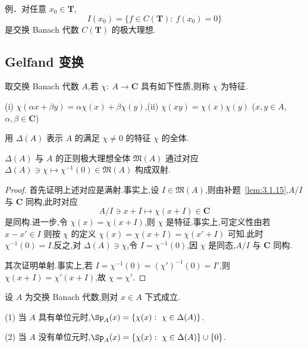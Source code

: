 例．对任意 $x_{0} \in \mathbf{T}$,
\begin{equation*}
I(x_{0}) = \{f \in C(\mathbf{T}):\ f(x_{0}) = 0\}
\end{equation*}
是交换 Banach 代数 $C(\mathbf{T})$ 的极大理想.

\subsection{Gelfand 变换}\label{sec:3.1.4}

\begin{definition}\label{def:3.1.17}
取交换 Banach 代数 $A$,若 $\chi:\ A \to \mathbf{C}$ 具有如下性质,则称 $\chi$ 为特征.

(i) $\chi(\alpha x + \beta y) = \alpha\chi(x) + \beta\chi(y)$,\quad (ii) $\chi(xy) = \chi(x)\chi(y)$ \quad($x, y \in A$,$\alpha, \beta \in \mathbf{C}$)

用 $\Delta(A)$ 表示 $A$ 的满足 $\chi \neq 0$ 的特征 $\chi$ 的全体.
\end{definition}

\begin{theorem}\label{thm:3.1.18}
$\Delta(A)$ 与 $A$ 的正则极大理想全体 $\mathfrak{M}(A)$ 通过对应 $\Delta(A) \ni \chi \mapsto \chi^{-1}(0) \in \mathfrak{M}(A)$ 构成双射.
\end{theorem}

\begin{proof}
首先证明上述对应是满射.事实上,设 $I \in \mathfrak{M}(A)$,则由补题~\ref{lem:3.1.15},$A/I$ 与 $\mathbf{C}$ 同构,此时对应
\begin{equation*}
A/I \ni x + I \mapsto \chi(x + I) \in \mathbf{C}
\end{equation*}
是同构.进一步,令 $\chi(x) = \chi(x + I)$,则 $\chi$ 是特征.事实上,可定义性由若 $x - x' \in I$ 则按 $\chi$ 的定义 $\chi(x) = \chi(x + I) = \chi(x' + I)$ 可知.此时 $\chi^{-1}(0) = I$.反之,对 $\Delta(A) \ni \chi$,令 $I = \chi^{-1}(0)$,因 $\chi$ 是同态,$A/I$ 与 $\mathbf{C}$ 同构.

其次证明单射.事实上,若 $I = \chi^{-1}(0) = (\chi')^{-1}(0) = I'$,则 $\chi(x + I) = \chi'(x + I)$,故 $\chi = \chi'$.
\end{proof}

\begin{corollary}\label{cor:3.1.19}
设 $A$ 为交换 Banach 代数,则对 $x \in A$ 下式成立.

(1) 当 $A$ 具有单位元时,$\Sp_{A}(x) = \{\chi(x):\ \chi \in \Delta(A)\}$.

(2) 当 $A$ 没有单位元时,$\Sp_{A}(x) = \{\chi(x):\ \chi \in \Delta(A)\} \cup \{0\}$.
\end{corollary}

